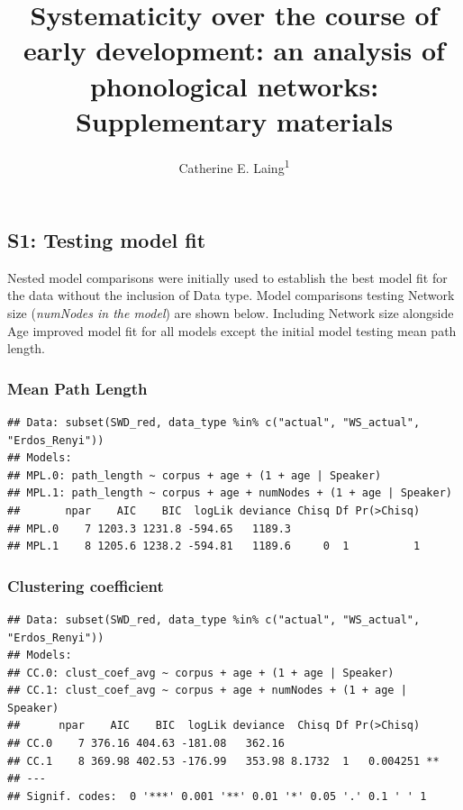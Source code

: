 \documentclass[
  man,floatsintext]{apa6}
\title{Systematicity over the course of early development: an analysis of phonological networks: Supplementary materials}
\author{Catherine E. Laing\textsuperscript{1}}
\date{}
\affiliation{\vspace{0.5cm}\textsuperscript{1} University of York, York, UK}
\begin{document}
\maketitle

\subsection{S1: Testing model fit}\label{s1-testing-model-fit}

Nested model comparisons were initially used to establish the best model fit for the data without the inclusion of Data type. Model comparisons testing Network size (\emph{numNodes in the model}) are shown below. Including Network size alongside Age improved model fit for all models except the initial model testing mean path length.

\subsubsection{Mean Path Length}\label{mean-path-length}

\begin{verbatim}
## Data: subset(SWD_red, data_type %in% c("actual", "WS_actual", "Erdos_Renyi"))
## Models:
## MPL.0: path_length ~ corpus + age + (1 + age | Speaker)
## MPL.1: path_length ~ corpus + age + numNodes + (1 + age | Speaker)
##       npar    AIC    BIC  logLik deviance Chisq Df Pr(>Chisq)
## MPL.0    7 1203.3 1231.8 -594.65   1189.3                    
## MPL.1    8 1205.6 1238.2 -594.81   1189.6     0  1          1
\end{verbatim}

\subsubsection{Clustering coefficient}\label{clustering-coefficient}

\begin{verbatim}
## Data: subset(SWD_red, data_type %in% c("actual", "WS_actual", "Erdos_Renyi"))
## Models:
## CC.0: clust_coef_avg ~ corpus + age + (1 + age | Speaker)
## CC.1: clust_coef_avg ~ corpus + age + numNodes + (1 + age | Speaker)
##      npar    AIC    BIC  logLik deviance  Chisq Df Pr(>Chisq)   
## CC.0    7 376.16 404.63 -181.08   362.16                        
## CC.1    8 369.98 402.53 -176.99   353.98 8.1732  1   0.004251 **
## ---
## Signif. codes:  0 '***' 0.001 '**' 0.01 '*' 0.05 '.' 0.1 ' ' 1
\end{verbatim}
\end{document}
